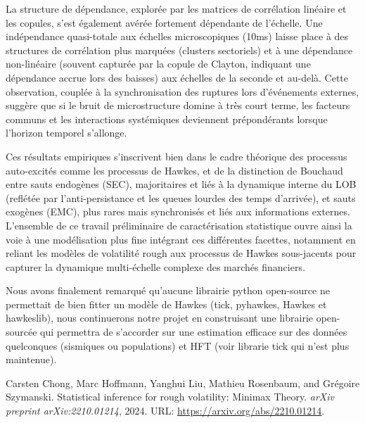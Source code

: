 \documentclass[10pt,a4paper]{article}
\theoremstyle{definition}
\theoremstyle{remark}
\begin{document}
\begin{itemize}
    La structure de dépendance, explorée par les matrices de corrélation linéaire et les copules, s'est également avérée fortement dépendante de l'échelle. Une indépendance quasi-totale aux échelles microscopiques (10ms) laisse place à des structures de corrélation plus marquées (clusters sectoriels) et à une dépendance non-linéaire (souvent capturée par la copule de Clayton, indiquant une dépendance accrue lors des baisses) aux échelles de la seconde et au-delà. Cette observation, couplée à la synchronisation des ruptures lors d'événements externes, suggère que si le bruit de microstructure domine à très court terme, les facteurs communs et les interactions systémiques deviennent prépondérants lorsque l'horizon temporel s'allonge.

    \vspace{0.5cm}

    Ces résultats empiriques s'inscrivent bien dans le cadre théorique des processus auto-excités comme les processus de Hawkes, et de la distinction de Bouchaud entre sauts endogènes (SEC), majoritaires et liés à la dynamique interne du LOB (reflétée par l'anti-persistance et les queues lourdes des temps d'arrivée), et sauts exogènes (EMC), plus rares mais synchronisés et liés aux informations externes. L'ensemble de ce travail préliminaire de caractérisation statistique ouvre ainsi la voie à une modélisation plus fine intégrant ces différentes facettes, notamment en reliant les modèles de volatilité rough aux processus de Hawkes sous-jacents pour capturer la dynamique multi-échelle complexe des marchés financiers.

    \vspace{0.5cm}

    Nous avons finalement remarqué qu'aucune librairie python open-source ne permettait de bien fitter un modèle de Hawkes (tick, pyhawkes, Hawkes et hawkeslib), nous continuerons notre projet en construisant une librairie open-sourcée qui permettra de s'accorder sur une estimation efficace sur des données quelconques (sismiques ou populations) et HFT (voir librarie tick qui n'est plus maintenue).

\newpage
\begin{thebibliography}{9}

Carsten Chong, Marc Hoffmann, Yanghui Liu, Mathieu Rosenbaum, and Grégoire Szymanski.
\newblock Statistical inference for rough volatility: Minimax Theory.
\newblock \emph{arXiv preprint arXiv:2210.01214}, 2024.
\newblock URL: \url{https://arxiv.org/abs/2210.01214}.


\end{thebibliography}
\end{itemize}
\end{document}
